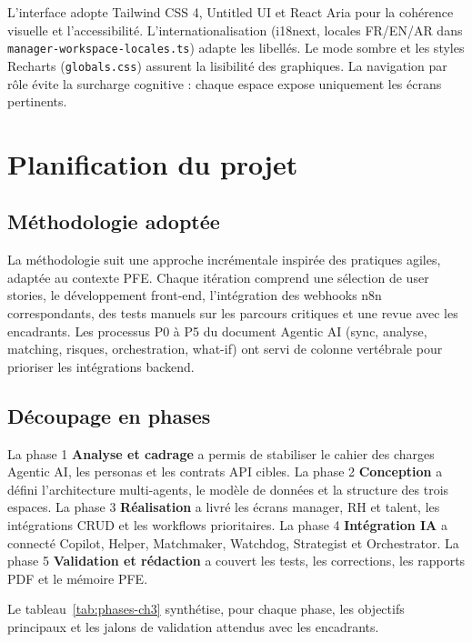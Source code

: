 L'interface adopte Tailwind CSS 4, Untitled UI et React Aria pour la cohérence visuelle et l'accessibilité. L'internationalisation (i18next, locales FR/EN/AR dans \texttt{manager-workspace-locales.ts}) adapte les libellés. Le mode sombre et les styles Recharts (\texttt{globals.css}) assurent la lisibilité des graphiques. La navigation par rôle évite la surcharge cognitive : chaque espace expose uniquement les écrans pertinents.

\section{Planification du projet}

\subsection{Méthodologie adoptée}

La méthodologie suit une approche incrémentale inspirée des pratiques agiles, adaptée au contexte PFE. Chaque itération comprend une sélection de user stories, le développement front-end, l'intégration des webhooks n8n correspondants, des tests manuels sur les parcours critiques et une revue avec les encadrants. Les processus P0 à P5 du document Agentic AI (sync, analyse, matching, risques, orchestration, what-if) ont servi de colonne vertébrale pour prioriser les intégrations backend.

\subsection{Découpage en phases}

La phase 1 \textbf{Analyse et cadrage} a permis de stabiliser le cahier des charges Agentic AI, les personas et les contrats API cibles. La phase 2 \textbf{Conception} a défini l'architecture multi-agents, le modèle de données et la structure des trois espaces. La phase 3 \textbf{Réalisation} a livré les écrans manager, RH et talent, les intégrations CRUD et les workflows prioritaires. La phase 4 \textbf{Intégration IA} a connecté Copilot, Helper, Matchmaker, Watchdog, Strategist et Orchestrator. La phase 5 \textbf{Validation et rédaction} a couvert les tests, les corrections, les rapports PDF et le mémoire PFE.

Le tableau~\ref{tab:phases-ch3} synthétise, pour chaque phase, les objectifs principaux et les jalons de validation attendus avec les encadrants.

